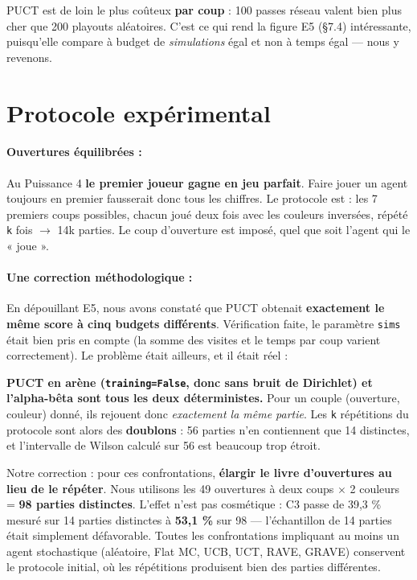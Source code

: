 \documentclass[11pt,a4paper]{article}
\begin{document}
PUCT est de loin le plus coûteux \textbf{par coup} : 100 passes réseau valent bien plus
cher que 200 playouts aléatoires. C'est ce qui rend la figure E5 (§7.4)
intéressante, puisqu'elle compare à budget de \emph{simulations} égal et non à temps
égal --- nous y revenons.

\section{Protocole expérimental}\label{protocole-expuxe9rimental}

\paragraph{Ouvertures équilibrées :}

Au Puissance 4 \textbf{le premier joueur gagne en jeu parfait}. Faire jouer un agent
toujours en premier fausserait donc tous les chiffres. Le protocole est :
les 7 premiers coups possibles, chacun joué deux fois avec les couleurs inversées,
répété \texttt{k} fois $\rightarrow$ 14k parties. Le coup d'ouverture est imposé, quel que soit
l'agent qui le « joue ».

\paragraph{Une correction méthodologique :}

En dépouillant E5, nous avons constaté que PUCT obtenait \textbf{exactement le même
score à cinq budgets différents}. Vérification faite, le paramètre \texttt{sims} était
bien pris en compte (la somme des visites et le temps par coup varient
correctement). Le problème était ailleurs, et il était réel :

\textbf{PUCT en arène (\texttt{training=False}, donc sans bruit de Dirichlet) et l'alpha-bêta
sont tous les deux déterministes.} Pour un couple (ouverture, couleur) donné, ils
rejouent donc \emph{exactement la même partie}. Les \texttt{k} répétitions du protocole sont
alors des \textbf{doublons} : 56 parties n'en contiennent que 14 distinctes, et
l'intervalle de Wilson calculé sur 56 est beaucoup trop étroit.

Notre correction : pour ces confrontations, \textbf{élargir le livre d'ouvertures au lieu
de le répéter}. Nous utilisons les 49 ouvertures à deux coups $\times$ 2 couleurs = \textbf{98
parties distinctes}. L'effet n'est pas cosmétique : C3 passe de 39,3 \% mesuré sur
14 parties distinctes à \textbf{53,1 \%} sur 98 --- l'échantillon de 14 parties était
simplement défavorable. Toutes les confrontations impliquant au moins un agent
stochastique (aléatoire, Flat MC, UCB, UCT, RAVE, GRAVE) conservent le protocole
initial, où les répétitions produisent bien des parties différentes.
\end{document}
